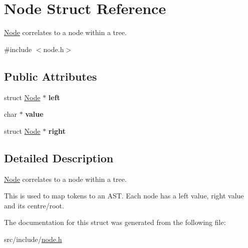 \hypertarget{struct_node}{}\section{Node Struct Reference}
\label{struct_node}


\mbox{\hyperlink{struct_node}{Node}} correlates to a node within a tree.  




{\ttfamily \#include $<$node.\+h$>$}

\subsection*{Public Attributes}
\begin{DoxyCompactItemize}
\item 
\mbox{\label{struct_node_ad0976834843c7618677d22a10c495b36}} 
struct \mbox{\hyperlink{struct_node}{Node}} $\ast$ {\bfseries left}
\item 
\mbox{\label{struct_node_a785f15caf45b9b7aa4984bc72bf4a525}} 
char $\ast$ {\bfseries value}
\item 
\mbox{\label{struct_node_af99e7102380da88d7c079fa264230cf4}} 
struct \mbox{\hyperlink{struct_node}{Node}} $\ast$ {\bfseries right}
\end{DoxyCompactItemize}


\subsection{Detailed Description}
\mbox{\hyperlink{struct_node}{Node}} correlates to a node within a tree. 

This is used to map tokens to an A\+ST. Each node has a left value, right value and its centre/root. 

The documentation for this struct was generated from the following file\+:\begin{DoxyCompactItemize}
\item 
src/include/\mbox{\hyperlink{node_8h}{node.\+h}}\end{DoxyCompactItemize}
